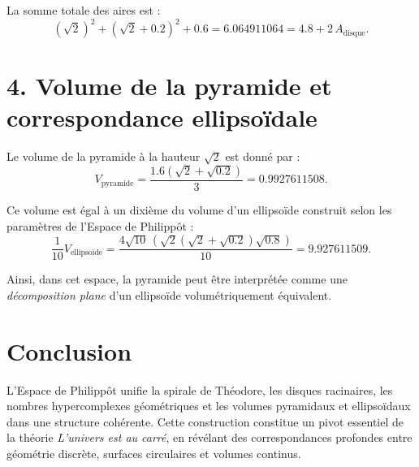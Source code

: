 \documentclass[12pt]{article}
\begin{document}
La somme totale des aires est :
\[
(\sqrt{2})^2 + (\sqrt{2} + 0.2)^2 + 0.6
= 6.064911064
= 4.8 + 2\,A_{\text{disque}}.
\]

\section*{4. Volume de la pyramide et correspondance ellipsoïdale}

Le volume de la pyramide à la hauteur $\sqrt{2}$ est donné par :
\[
V_{\text{pyramide}} = \frac{1.6 \left( \sqrt{2} + \sqrt{0.2} \right)}{3}
= 0.9927611508.
\]

Ce volume est égal à un dixième du volume d’un ellipsoïde construit selon les paramètres de l’Espace de Philippôt :
\[
\frac{1}{10} V_{\text{ellipsoïde}}
= \frac{4\sqrt{10}\,\left( \sqrt{2}(\sqrt{2}+\sqrt{0.2})\sqrt{0.8} \right)}{10}
= 9.927611509.
\]

Ainsi, dans cet espace, la pyramide peut être interprétée comme une \emph{décomposition plane} d’un ellipsoïde volumétriquement équivalent.

\section*{Conclusion}

L’Espace de Philippôt unifie la spirale de Théodore, les disques racinaires, les nombres hypercomplexes géométriques et les volumes pyramidaux et ellipsoïdaux dans une structure cohérente. Cette construction constitue un pivot essentiel de la théorie \emph{L’univers est au carré}, en révélant des correspondances profondes entre géométrie discrète, surfaces circulaires et volumes continus.
\end{document}
